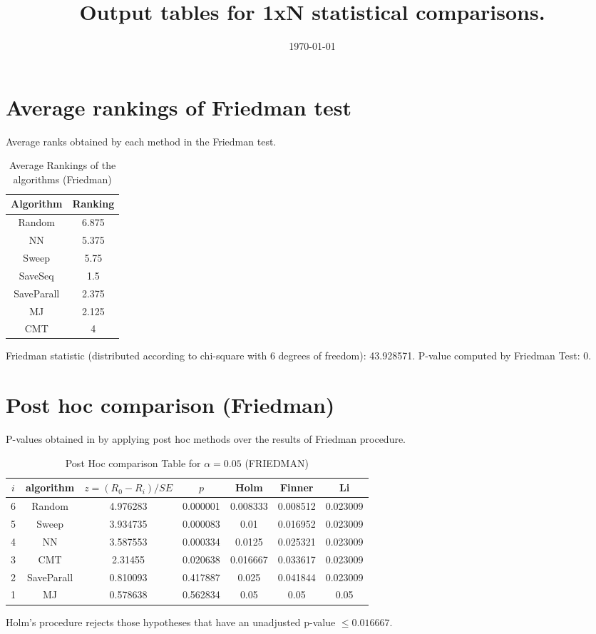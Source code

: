 \documentclass[a4paper,10pt]{article}
\title{Output tables for 1xN statistical comparisons.}
\author{}
\date{\today}
\begin{document}
\begin{landscape}
\pagestyle{empty}
\maketitle
\thispagestyle{empty}

\section{Average rankings of Friedman test}


Average ranks obtained by each method in the Friedman test.

\begin{table}[!htp]
\centering
\begin{tabular}{|c|c|}\hline
Algorithm&Ranking\\\hline
Random&6.875\\NN&5.375\\Sweep&5.75\\SaveSeq&1.5\\SaveParall&2.375\\MJ&2.125\\CMT&4\\\hline\end{tabular}
\caption{Average Rankings of the algorithms (Friedman)}
\end{table}

Friedman statistic (distributed according to chi-square with 6 degrees of freedom): 43.928571. \newline P-value computed by Friedman Test: 0.\newline


\newpage

\section{Post hoc comparison (Friedman)}


P-values obtained in by applying post hoc methods over the results of Friedman procedure.

\begin{table}[!htp]
\centering\footnotesize
\begin{tabular}{ccccccc}
$i$&algorithm&$z=(R_0 - R_i)/SE$&$p$&Holm &Finner&Li\\
\hline6&Random&4.976283&0.000001&0.008333&0.008512&0.023009\\5&Sweep&3.934735&0.000083&0.01&0.016952&0.023009\\4&NN&3.587553&0.000334&0.0125&0.025321&0.023009\\3&CMT&2.31455&0.020638&0.016667&0.033617&0.023009\\2&SaveParall&0.810093&0.417887&0.025&0.041844&0.023009\\1&MJ&0.578638&0.562834&0.05&0.05&0.05\\\hline
\end{tabular}
\caption{Post Hoc comparison Table for $\alpha=0.05$ (FRIEDMAN)}
\end{table}Holm's procedure rejects those hypotheses that have an unadjusted p-value $\le0.016667$.


\end{landscape}
\end{document}
